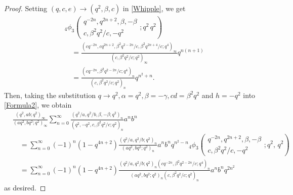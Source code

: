 \documentclass[reqno,12pt]{amsart}
\theoremstyle{remark}
\numberwithin{equation}{section}
\begin{document}
\begin{proof}
Setting $\left(q,c,e\right)\to\left(q^2,\beta,c\right)$ in \eqref{Whipple}, we get
\begin{align}
&_4\phi_3\left(\begin{array}{cccc}
q^{-2n},q^{2n+2},\beta,-\beta\\
c,\beta^2q^2/c,-q^2
\end{array};q^2\,q^2\right)\nonumber\\
&\quad=\frac{\left(cq^{-2n},cq^{2n+2},\beta^2q^{2-2n}/c,
\beta^2q^{2n+4}/c;q^4\right)_{\infty}}
{\left(c,\beta^2q^2/c;q^2\right)_{\infty}}q^{n\left(n+1\right)}\nonumber\\
&\quad=\frac{\left(cq^{-2n},\beta^2q^{2-2n}/c;q^4\right)_n}
{\left(c,\beta^2q^2/c;q^2\right)_{n}}q^{n^2+n}.\label{equ2}
\end{align}
Then, taking the substitution $q\to q^2, \alpha=q^2, \beta=-\gamma, cd=\beta^2q^2$ and $h=-q^2$  into \eqref{Formula2}, we obtain
\begin{align*}
&\frac{\left(q^2,ab;q^2\right)_{\infty}}{\left(aq^2,bq^2;q^2\right)_{\infty}}
\sum_{n=0}^{\infty}\frac{\left(q^2/a,q^2/b,\beta,-\beta;q^2\right)_n}
{\left(q^2,-q^2,c,\beta^2q^2/c;q^2\right)_n}a^nb^n\nonumber\\
&\quad=
\sum_{n=0}^{\infty}
\left(-1\right)^n\left(1-q^{4n+2}\right)
\frac{\left(q^2/a,q^2/b;q^2\right)_n}
{\left(aq^2,bq^2;q^2\right)_n}a^nb^nq^{n^2-n}
{_4\phi_3}\left(\begin{array}{cccc}
q^{-2n},q^{2n+2},\beta,-\beta\\
c,\beta^2q^2/c,-q^2
\end{array};q^2,\,q^2\right)\\
&\quad=
\sum_{n=0}^{\infty}
\left(-1\right)^n\left(1-q^{4n+2}\right)
\frac{\left(q^2/a,q^2/b;q^2\right)_n
\left(cq^{-2n},\beta^2q^{2-2n}/c;q^4\right)_n}
{\left(aq^2,bq^2;q^2\right)_n\left(c,\beta^2q^2/c;q^2\right)_n}a^nb^nq^{2n^2}
\end{align*}
as desired.
\end{proof}
\end{document}
